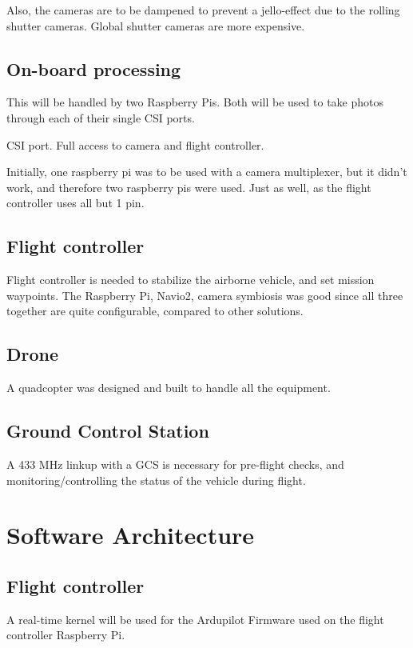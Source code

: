 Also, the cameras are to be dampened to prevent a jello-effect due to the rolling shutter cameras. Global shutter cameras are more expensive.

\subsection{On-board processing}

This will be handled by two Raspberry Pis. Both will be used to take photos through each of their single CSI ports.

CSI port. Full access to camera and flight controller.

Initially, one raspberry pi was to be used with a camera multiplexer, but it didn't work, and therefore two raspberry pis were used. Just as well, as the flight controller uses all but 1 pin.

\subsection{Flight controller}

Flight controller is needed to stabilize the airborne vehicle, and set mission waypoints. The Raspberry Pi, Navio2, camera symbiosis was good since all three together are quite configurable, compared to other solutions.

\subsection{Drone}

A quadcopter was designed and built to handle all the equipment.

\subsection{Ground Control Station}

A 433 MHz linkup with a GCS is necessary for pre-flight checks, and monitoring/controlling the status of the vehicle during flight.

\section{Software Architecture}

\subsection{Flight controller}

A real-time kernel will be used for the Ardupilot Firmware used on the flight controller Raspberry Pi.


